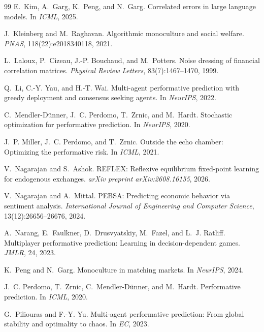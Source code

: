 \documentclass{article}
\theoremstyle{plain}
\theoremstyle{definition}
\begin{document}
\begin{thebibliography}{99}
 E.~Kim, A.~Garg, K.~Peng, and N.~Garg. Correlated errors in large language models. In \emph{ICML}, 2025.

 J.~Kleinberg and M.~Raghavan. Algorithmic monoculture and social welfare. \emph{PNAS}, 118(22):e2018340118, 2021.

 L.~Laloux, P.~Cizeau, J.-P. Bouchaud, and M.~Potters. Noise dressing of financial correlation matrices. \emph{Physical Review Letters}, 83(7):1467--1470, 1999.

 Q.~Li, C.-Y. Yau, and H.-T. Wai. Multi-agent performative prediction with greedy deployment and consensus seeking agents. In \emph{NeurIPS}, 2022.

 C.~Mendler-D\"unner, J.~C. Perdomo, T.~Zrnic, and M.~Hardt. Stochastic optimization for performative prediction. In \emph{NeurIPS}, 2020.

 J.~P. Miller, J.~C. Perdomo, and T.~Zrnic. Outside the echo chamber: Optimizing the performative risk. In \emph{ICML}, 2021.

 V.~Nagarajan and S.~Ashok. REFLEX: Reflexive equilibrium fixed-point learning for endogenous exchanges. \emph{arXiv preprint arXiv:2608.16155}, 2026.

 V.~Nagarajan and A.~Mittal. PEBSA: Predicting economic behavior via sentiment analysis. \emph{International Journal of Engineering and Computer Science}, 13(12):26656--26676, 2024.

 A.~Narang, E.~Faulkner, D.~Drusvyatskiy, M.~Fazel, and L.~J. Ratliff. Multiplayer performative prediction: Learning in decision-dependent games. \emph{JMLR}, 24, 2023.

 K.~Peng and N.~Garg. Monoculture in matching markets. In \emph{NeurIPS}, 2024.

 J.~C. Perdomo, T.~Zrnic, C.~Mendler-D\"unner, and M.~Hardt. Performative prediction. In \emph{ICML}, 2020.

 G.~Piliouras and F.-Y. Yu. Multi-agent performative prediction: From global stability and optimality to chaos. In \emph{EC}, 2023.


\end{thebibliography}
\end{document}
